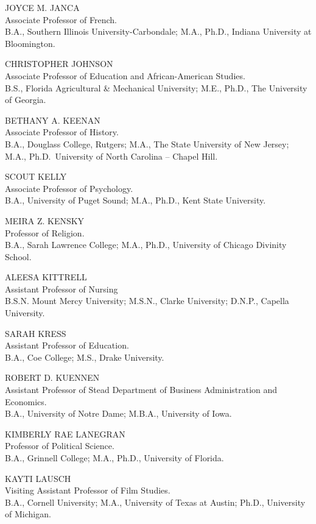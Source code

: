 \documentclass[
  letterpaper,
]{scrbook}
\begin{document}
JOYCE M. JANCA\\
Associate Professor of French.\\
B.A., Southern Illinois University-Carbondale; M.A., Ph.D., Indiana
University at Bloomington.

CHRISTOPHER JOHNSON\\
Associate Professor of Education and African-American Studies.\\
B.S., Florida Agricultural \& Mechanical University; M.E., Ph.D., The
University of Georgia.

BETHANY A. KEENAN\\
Associate Professor of History.\\
B.A., Douglass College, Rutgers; M.A., The State University of New
Jersey; M.A., Ph.D.~University of North Carolina -- Chapel Hill.

SCOUT KELLY\\
Associate Professor of Psychology.\\
B.A., University of Puget Sound; M.A., Ph.D., Kent State University.

MEIRA Z. KENSKY\\
Professor of Religion.\\
B.A., Sarah Lawrence College; M.A., Ph.D., University of Chicago
Divinity School.

ALEESA KITTRELL\\
Assistant Professor of Nursing\\
B.S.N. Mount Mercy University; M.S.N., Clarke University; D.N.P.,
Capella University.

SARAH KRESS\\
Assistant Professor of Education.\\
B.A., Coe College; M.S., Drake University.

ROBERT D. KUENNEN\\
Assistant Professor of Stead Department of Business Administration and
Economics.\\
B.A., University of Notre Dame; M.B.A., University of Iowa.

KIMBERLY RAE LANEGRAN\\
Professor of Political Science.\\
B.A., Grinnell College; M.A., Ph.D., University of Florida.

KAYTI LAUSCH\\
Visiting Assistant Professor of Film Studies.\\
B.A., Cornell University; M.A., University of Texas at Austin; Ph.D.,
University of Michigan.
\end{document}
